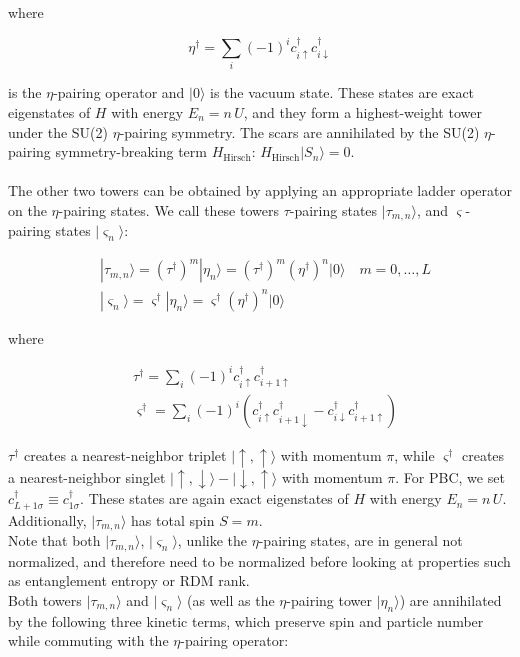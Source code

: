 \documentclass[11pt]{article}
\begin{document}
\begin{itemize}
\begin{itemize}
    where
    
    \begin{equation}
    \eta^\dag = \sum_i (-1)^i c^\dagger_{i\uparrow} c^\dagger_{i\downarrow}
    \end{equation}
    
     is the \(\eta\)-pairing operator and \( |0\rangle \) is the vacuum state. These states are exact eigenstates of \( H \) with energy \( E_n = n\,U \), and they form a highest-weight tower under the SU(2) \(\eta\)-pairing symmetry. The scars are annihilated by  	     the SU(2) \(\eta\)-pairing symmetry-breaking term $H_{\text{Hirsch}}$: $H_{\text{Hirsch}}|S_n\rangle  = 0$.\\
    \vspace{1mm}\\
    The other two towers can be obtained by applying an appropriate ladder operator on the $\eta$-pairing states. We call these towers \(\tau\)-pairing states $|\tau_{m,n}\rangle$, and \(\varsigma\)-pairing states $|\varsigma_n\rangle$:
    
    \begin{align}
    &|\tau_{m,n}\rangle = (\tau^\dag)^m |\eta_n\rangle = (\tau^\dag)^m (\eta^\dag)^n |0\rangle \quad m=0,\hdots,L \\
    &|\varsigma_n\rangle = \varsigma^\dag |\eta_n\rangle = \varsigma^\dag (\eta^\dag)^n |0\rangle 
    \end{align}

    where
    
    \begin{align}
    &\tau^\dag = \sum_i (-1)^i c^\dagger_{i\uparrow} c^\dagger_{i+1\uparrow}\\
    &\varsigma^\dag = \sum_i (-1)^i \left( c^\dagger_{i\uparrow} c^\dagger_{i+1\downarrow} - c^\dagger_{i\downarrow} c^\dagger_{i+1\uparrow} \right)
    \end{align}
    
    $\tau^\dagger$ creates a nearest-neighbor triplet $\lvert\uparrow, \uparrow\rangle$ with momentum $\pi$, while $\varsigma^\dagger$ creates a nearest-neighbor singlet $\lvert\uparrow, \downarrow\rangle - \lvert\downarrow, \uparrow\rangle$ with momentum $\pi$. For PBC, we set $c^\dagger_{L+1\sigma} \equiv c^\dagger_{1\sigma}$. These states are again exact eigenstates of \( H \) with energy \( E_n = n\,U \). Additionally, $|\tau_{m,n}\rangle$ has total spin $S=m$.\\
Note that both $|\tau_{m,n}\rangle$, $|\varsigma_n\rangle$, unlike the $\eta$-pairing states, are in general not normalized, and therefore need to be normalized before looking at properties such as entanglement entropy or RDM rank.\\
Both towers \( |\tau_{m,n}\rangle \) and \( |\varsigma_n\rangle \) (as well as the $\eta$-pairing tower \( |\eta_n\rangle \)) are annihilated by the following three kinetic terms, which preserve spin and particle number while commuting with the \(\eta\)-pairing operator:


\end{itemize}
\end{itemize}
\end{document}
